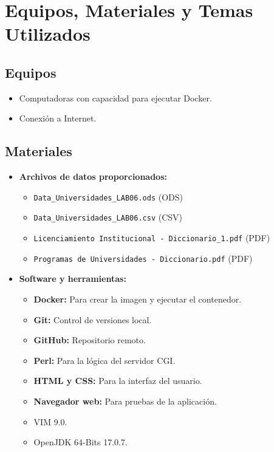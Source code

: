 \documentclass{article}
\begin{document}
    \section{Equipos, Materiales y Temas Utilizados}
    
    \subsection*{Equipos}
    \begin{itemize}
        \item Computadoras con capacidad para ejecutar Docker.
        \item Conexión a Internet.
    \end{itemize}
    
    \subsection*{Materiales}
    \begin{itemize}
        \item \textbf{Archivos de datos proporcionados:}
        \begin{itemize}
            \item \texttt{Data\_Universidades\_LAB06.ods} (ODS)
            \item \texttt{Data\_Universidades\_LAB06.csv} (CSV)
            \item \texttt{Licenciamiento Institucional - Diccionario\_1.pdf} (PDF)
            \item \texttt{Programas de Universidades - Diccionario.pdf} (PDF)
        \end{itemize}
        \item \textbf{Software y herramientas:}
        \begin{itemize}
            \item \textbf{Docker:} Para crear la imagen y ejecutar el contenedor.
            \item \textbf{Git:} Control de versiones local.
            \item \textbf{GitHub:} Repositorio remoto.
            \item \textbf{Perl:} Para la lógica del servidor CGI.
            \item \textbf{HTML y CSS:} Para la interfaz del usuario.
            \item \textbf{Navegador web:} Para pruebas de la aplicación.
    		\item VIM 9.0.
    		\item OpenJDK 64-Bits 17.0.7.
        \end{itemize}
    \end{itemize}
    
\end{document}
